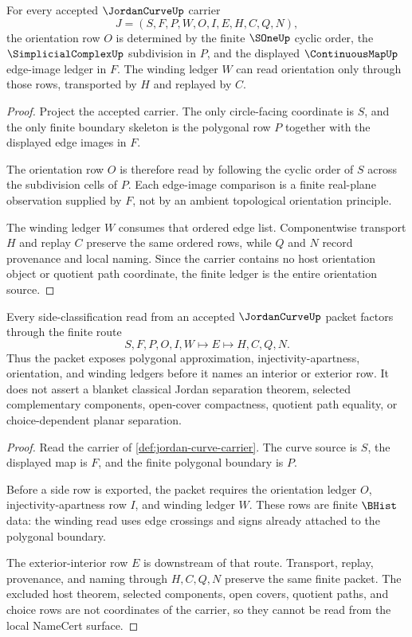 \begin{theorem}
\label{thm:jordan-curve-orientation-ledger}
For every accepted $\JordanCurveUp$ carrier
$$
J=(S,F,P,W,O,I,E,H,C,Q,N),
$$
the orientation row $O$ is determined by the finite $\SOneUp$ cyclic order, the $\SimplicialComplexUp$ subdivision in $P$, and the displayed $\ContinuousMapUp$ edge-image ledger in $F$. The winding ledger $W$ can read orientation only through those rows, transported by $H$ and replayed by $C$.
\end{theorem}
\begin{proof}
Project the accepted carrier. The only circle-facing coordinate is $S$, and the only finite boundary skeleton is the polygonal row $P$ together with the displayed edge images in $F$.

The orientation row $O$ is therefore read by following the cyclic order of $S$ across the subdivision cells of $P$. Each edge-image comparison is a finite real-plane observation supplied by $F$, not by an ambient topological orientation principle.

The winding ledger $W$ consumes that ordered edge list. Componentwise transport $H$ and replay $C$ preserve the same ordered rows, while $Q$ and $N$ record provenance and local naming. Since the carrier contains no host orientation object or quotient path coordinate, the finite ledger is the entire orientation source.
\end{proof}

\begin{theorem}
\label{thm:jordan-curve-winding-separation}
Every side-classification read from an accepted $\JordanCurveUp$ packet factors through the finite route
$$
S,F,P,O,I,W\longmapsto E\longmapsto H,C,Q,N .
$$
Thus the packet exposes polygonal approximation, injectivity-apartness, orientation, and winding ledgers before it names an interior or exterior row. It does not assert a blanket classical Jordan separation theorem, selected complementary components, open-cover compactness, quotient path equality, or choice-dependent planar separation.
\end{theorem}
\begin{proof}
Read the carrier of \autoref{def:jordan-curve-carrier}. The curve source is $S$, the displayed map is $F$, and the finite polygonal boundary is $P$.

Before a side row is exported, the packet requires the orientation ledger $O$, injectivity-apartness row $I$, and winding ledger $W$. These rows are finite $\BHist$ data: the winding read uses edge crossings and signs already attached to the polygonal boundary.

The exterior-interior row $E$ is downstream of that route. Transport, replay, provenance, and naming through $H,C,Q,N$ preserve the same finite packet. The excluded host theorem, selected components, open covers, quotient paths, and choice rows are not coordinates of the carrier, so they cannot be read from the local NameCert surface.
\end{proof}

